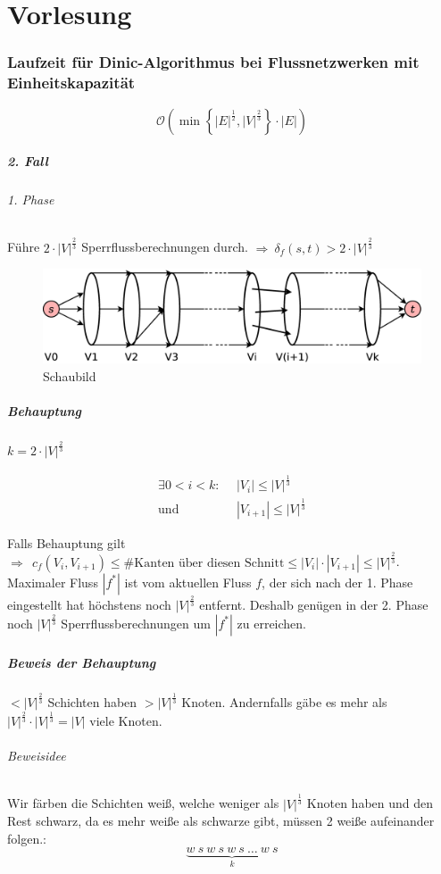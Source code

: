 \chapter{Vorlesung}
\subsection[Laufzeit für Dinic-Algo. bei Flussnetzwerken mit Einheitskapazität]{Laufzeit für Dinic-Algorithmus bei Flussnetzwerken mit Einheitskapazität}
\[ \mathcal{O}\left( \min\left\{ |E|^\frac{1}{2},|V|^\frac{2}{3} \right\}\cdot|E| \right) \]
\paragraph{2. Fall}
\subparagraph{1. Phase} Führe $2\cdot |V|^\frac{2}{3}$ Sperrflussberechnungen durch.
$\Rightarrow~\delta_f(s,t)>2\cdot|V|^\frac{2}{3}$
\begin{figure}[h]
\centering
\includegraphics[width=0.7\linewidth]{28/Grafik/Diagramm1}
\caption{Schaubild}
\label{fig:Diagramm1}
\end{figure}
\paragraph{Behauptung}
\begin{flushright}
	$k=2\cdot|V|^\frac{2}{3}$
\end{flushright}
\begin{align*}
 \exists 0<i<k:~~&|V_i|\leq |V|^\frac{1}{3}\\
 \text{und }&|V_{i+1}|\leq |V|^\frac{1}{3}
\end{align*}

Falls Behauptung gilt $\Rightarrow ~~c_f(V_i,V_{i+1}) \leq \#\text{Kanten über diesen Schnitt}\leq |V_i|\cdot|V_{i+1}| \leq|V|^\frac{2}{3}$. Maximaler Fluss $|f^*|$ ist vom aktuellen Fluss $f$, der sich nach der 1. Phase eingestellt hat höchstens noch $|V|^\frac{2}{3}$ entfernt. Deshalb genügen in der 2. Phase noch $|V|^\frac{2}{3}$ Sperrflussberechnungen um $|f^*|$ zu erreichen.
\paragraph{Beweis der Behauptung}
$<|V|^\frac{2}{3}$ Schichten haben $>|V|^\frac{1}{3}$ Knoten. Andernfalls gäbe es mehr als $|V|^\frac{2}{3}\cdot|V|^\frac{1}{3}=|V|$ viele Knoten.
\subparagraph{Beweisidee}
Wir färben die Schichten weiß, welche weniger als $|V|^\frac{1}{3}$ Knoten haben und den Rest schwarz, da es mehr weiße als schwarze gibt, müssen 2 weiße aufeinander folgen.:
\[ \underset{k}{\underbrace{w~s~w~s~w~s~\ldots~w~s}} \]

